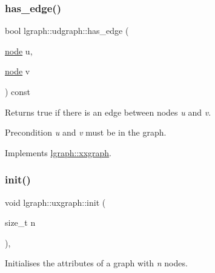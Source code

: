 \mbox{\label{classlgraph_1_1udgraph_a31370a81898abdc230ad2a3b0d274187}} 
\subsubsection{\texorpdfstring{has\+\_\+edge()}{has\_edge()}}
{\footnotesize\ttfamily bool lgraph\+::udgraph\+::has\+\_\+edge (\begin{DoxyParamCaption}\item[{\hyperlink{namespacelgraph_a397169dd66adf725210a30fb7251773e}{node}}]{u,  }\item[{\hyperlink{namespacelgraph_a397169dd66adf725210a30fb7251773e}{node}}]{v }\end{DoxyParamCaption}) const\hspace{0.3cm}{\ttfamily [virtual]}}



Returns true if there is an edge between nodes {\itshape u} and {\itshape v}. 

\begin{DoxyPrecond}{Precondition}
{\itshape u} and {\itshape v} must be in the graph. 
\end{DoxyPrecond}


Implements \hyperlink{classlgraph_1_1xxgraph_a4e36e9722df020df6ba1dc47b7d9d830}{lgraph\+::xxgraph}.

\mbox{\label{classlgraph_1_1uxgraph_a539e735d68b55ce01d733262c9db34d5}} 
\subsubsection{\texorpdfstring{init()}{init()}\hspace{0.1cm}{\footnotesize\ttfamily [1/3]}}
{\footnotesize\ttfamily void lgraph\+::uxgraph\+::init (\begin{DoxyParamCaption}\item[{size\+\_\+t}]{n }\end{DoxyParamCaption})\hspace{0.3cm}{\ttfamily [virtual]}, {\ttfamily [inherited]}}



Initialises the attributes of a graph with {\itshape n} nodes. 

